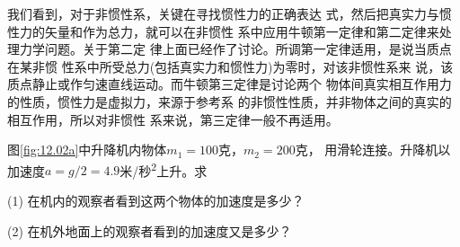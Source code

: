 我们看到，对于非惯性系，关键在寻找惯性力的正确表达
式，然后把真实力与惯性力的矢量和作为总力，就可以在非惯性
系中应用牛顿第一定律和第二定律来处理力学问题。关于第二定
律上面已经作了讨论。所调第一定律适用，是说当质点在某非惯
性系中所受总力(包括真实力和惯性力)为零时，对该非惯性系来
说，该质点静止或作匀速直线运动。而牛顿第三定律是讨论两个
物体间真实相互作用力的性质，惯性力是虚拟力，来源于参考系
的非惯性性质，并非物体之间的真实的相互作用，所以对非惯性
系来说，第三定律一般不再适用。

\begin{figure}[h]
  \vspace{1em}
  \centering
  \caption{}
  \label{fig:12.02}
  \vspace{0.5em}
\end{figure}

\example 图\ref{fig:12.02a}中升降机内物体$ m _ { 1 } = 1 0 0 $克，$ m _ { 2 } = 2 0 0 $克，
用滑轮连接。升降机以加速度$ a = g / 2 = 4 . 9 $米/秒\textsuperscript{2}上升。求

(1) 在机内的观察者看到这两个物体的加速度是多少？

(2) 在机外地面上的观察者看到的加速度又是多少？

